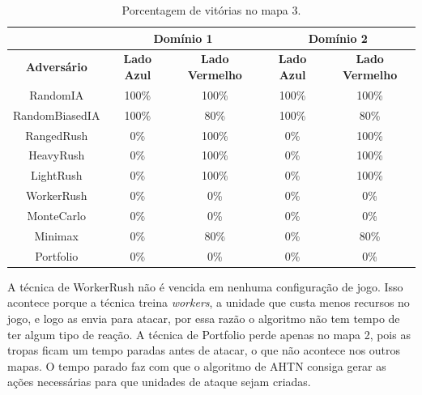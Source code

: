 \begin{table}[ht]
	\centering
	\caption{Porcentagem de vitórias no mapa 3.}
	\label{tab:mapa3}
	\begin{tabular}{|c|cc|cc|}
		\hline
		\textbf{}           & \multicolumn{2}{c|}{\textbf{Domínio 1}}  & \multicolumn{2}{c|}{\textbf{Domínio 2}}  \\ \hline
		\textbf{Adversário} & \textbf{Lado Azul} & \textbf{Lado Vermelho} & \textbf{Lado Azul} & \textbf{Lado Vermelho} \\ \hline
		RandomIA            & 100\%              & 100\%                  & 100\%              & 100\%                  \\ \hline
		RandomBiasedIA      & 100\%              & 80\%                   & 100\%              & 80\%                   \\ \hline
		RangedRush          & 0\%                & 100\%                  & 0\%                & 100\%                  \\ \hline
		HeavyRush           & 0\%                & 100\%                  & 0\%                & 100\%                  \\ \hline
		LightRush           & 0\%                & 100\%                  & 0\%                & 100\%                  \\ \hline
		WorkerRush          & 0\%                & 0\%                    & 0\%                & 0\%                    \\ \hline
		MonteCarlo          & 0\%                & 0\%                    & 0\%                & 0\%                    \\ \hline
		Minimax             & 0\%                & 80\%                   & 0\%               & 80\%                   \\ \hline
		Portfolio           & 0\%                & 0\%                    & 0\%                & 0\%                    \\ \hline
	\end{tabular}
\end{table}

A técnica de WorkerRush não é vencida em nenhuma configuração de jogo.
Isso acontece porque a técnica treina \textit{workers}, a unidade que custa menos recursos no jogo, e logo as envia para atacar, por essa razão o algoritmo não tem tempo de ter algum tipo de reação.
A técnica de Portfolio perde apenas no mapa 2, pois as tropas ficam um tempo paradas antes de atacar, o que não acontece nos outros mapas.
O tempo parado faz com que o algoritmo de AHTN consiga gerar as ações necessárias para que unidades de ataque sejam criadas.

